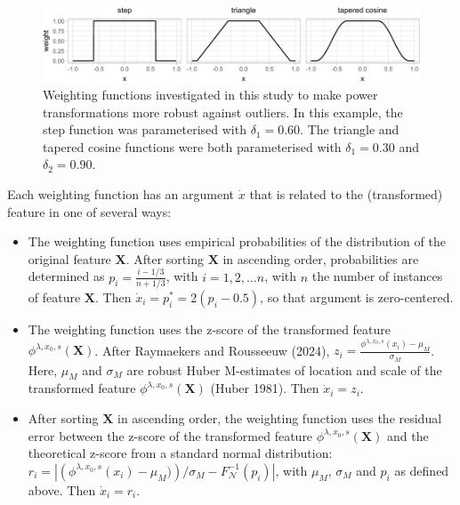 \documentclass[
  a4paper,
]{article}
\begin{document}
\begin{figure}

{\centering \includegraphics{manuscript_files/figure-latex/weighting-functions-1} 

}

\caption{Weighting functions investigated in this study to make power transformations more robust against outliers. In this example, the step function was parameterised with $\delta_1 = 0.60$. The triangle and tapered cosine functions were both parameterised with $\delta_1 = 0.30$ and $\delta_2 = 0.90$.}\label{fig:weighting-functions}
\end{figure}

Each weighting function has an argument \(\dot{x}\) that is related to
the (transformed) feature in one of several ways:

\begin{itemize}
\item
  The weighting function uses empirical probabilities of the
  distribution of the original feature \(\mathbf{X}\). After sorting
  \(\mathbf{X}\) in ascending order, probabilities are determined as
  \(p_i = \frac{i - 1/3}{n + 1/3}\), with \(i = 1, 2, \ldots n\), with
  \(n\) the number of instances of feature \(\mathbf{X}\). Then
  \(\dot{x}_i = p^{*}_i=2 \left( p_i - 0.5\right)\), so that argument is
  zero-centered.
\item
  The weighting function uses the z-score of the transformed feature
  \(\phi^{\lambda, x_0, s} (\mathbf{X})\). After Raymaekers and
  Rousseeuw (2024),
  \(z_i = \frac{\phi^{\lambda, x_0, s}(x_i) - \mu_M}{\sigma_M}\). Here,
  \(\mu_M\) and \(\sigma_M\) are robust Huber M-estimates of location
  and scale of the transformed feature
  \(\phi^{\lambda, x_0, s} (\mathbf{X})\) (Huber 1981). Then
  \(\dot{x}_i = z_i\).
\item
  After sorting \(\mathbf{X}\) in ascending order, the weighting
  function uses the residual error between the z-score of the
  transformed feature \(\phi^{\lambda, x_0, s} (\mathbf{X})\) and the
  theoretical z-score from a standard normal distribution:
  \(r_i =\left| \left( \phi^{\lambda, x_0, s}(x_i) - \mu_M)\right) / \sigma_M - F^{-1}_{\mathcal{N}}(p_i) \right|\),
  with \(\mu_M\), \(\sigma_M\) and \(p_i\) as defined above. Then
  \(\dot{x}_i = r_i\).
\end{itemize}
\end{document}

